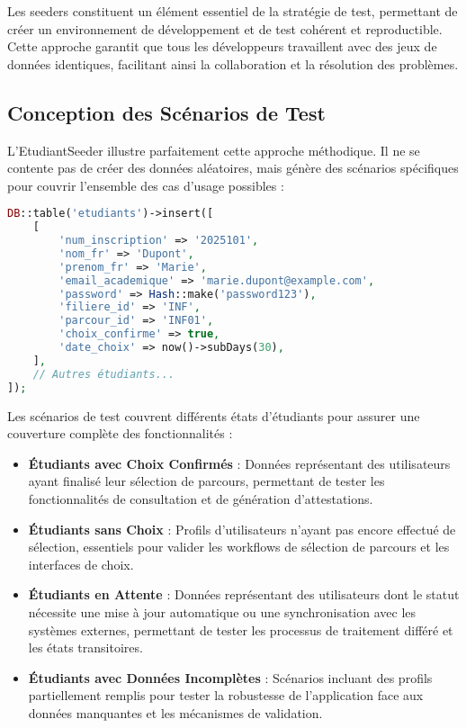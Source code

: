 \documentclass[12pt,a4paper]{report}
\begin{document}
Les seeders constituent un élément essentiel de la stratégie de test, permettant de créer un environnement de développement et de test cohérent et reproductible. Cette approche garantit que tous les développeurs travaillent avec des jeux de données identiques, facilitant ainsi la collaboration et la résolution des problèmes.

\subsection{Conception des Scénarios de Test}

L'EtudiantSeeder illustre parfaitement cette approche méthodique. Il ne se contente pas de créer des données aléatoires, mais génère des scénarios spécifiques pour couvrir l'ensemble des cas d'usage possibles :

\begin{lstlisting}[language=PHP]
DB::table('etudiants')->insert([
    [
        'num_inscription' => '2025101',
        'nom_fr' => 'Dupont',
        'prenom_fr' => 'Marie',
        'email_academique' => 'marie.dupont@example.com',
        'password' => Hash::make('password123'),
        'filiere_id' => 'INF',
        'parcour_id' => 'INF01',
        'choix_confirme' => true,
        'date_choix' => now()->subDays(30),
    ],
    // Autres étudiants...
]);
\end{lstlisting}

Les scénarios de test couvrent différents états d'étudiants pour assurer une couverture complète des fonctionnalités :

\begin{itemize}
\item \textbf{Étudiants avec Choix Confirmés} : Données représentant des utilisateurs ayant finalisé leur sélection de parcours, permettant de tester les fonctionnalités de consultation et de génération d'attestations.

\item \textbf{Étudiants sans Choix} : Profils d'utilisateurs n'ayant pas encore effectué de sélection, essentiels pour valider les workflows de sélection de parcours et les interfaces de choix.

\item \textbf{Étudiants en Attente} : Données représentant des utilisateurs dont le statut nécessite une mise à jour automatique ou une synchronisation avec les systèmes externes, permettant de tester les processus de traitement différé et les états transitoires.

\item \textbf{Étudiants avec Données Incomplètes} : Scénarios incluant des profils partiellement remplis pour tester la robustesse de l'application face aux données manquantes et les mécanismes de validation.
\end{itemize}
\end{document}

